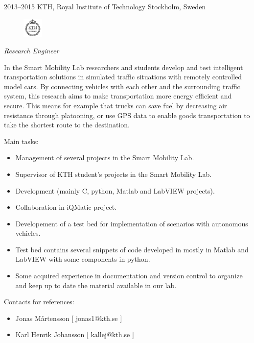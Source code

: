 \documentclass[]{friggeri-cv}
\begin{document}
\begin{entrylist}
\entry
{2013--2015}
{KTH, Royal Institute of Technology}
{Stockholm, Sweden}
{
\begin{figure}
	\vspace{-20pt}
	\begin{center}
		\includegraphics[width=1cm,height=1cm]{kth}
	\end{center}
\end{figure}
\emph{Research Engineer}

In the Smart Mobility Lab researchers and students develop and test intelligent transportation solutions in simulated traffic situations with remotely controlled model cars. By connecting vehicles with each other and the surrounding traffic system, this research aims to make transportation more energy efficient and secure. This means for example that trucks can save fuel by decreasing air resistance through platooning, or use GPS data to enable goods transportation to take the shortest route to the destination.

Main tasks:
\begin{itemize}
	\item Management of several projects in the Smart Mobility Lab.
	\item Supervisor of KTH student's projects in the Smart Mobility Lab.
	\item Development (mainly C, python, Matlab and LabVIEW projects).
	\item Collaboration in iQMatic project.
	\item Developement of a test bed for implementation of scenarios with autonomous vehicles.
	\item Test bed contains several snippets of code developed in mostly in Matlab and LabVIEW with some components in python.
	\item Some acquired experience in documentation and version control to organize and keep up to date the material available in our lab.
\end{itemize}
Contacts for references:
\begin{itemize}
	\item Jonas Mårtensson [ jonas1@kth.se ]
	\item Karl Henrik Johansson [ kallej@kth.se ]
\end{itemize}
}

\end{entrylist}
\end{document}
